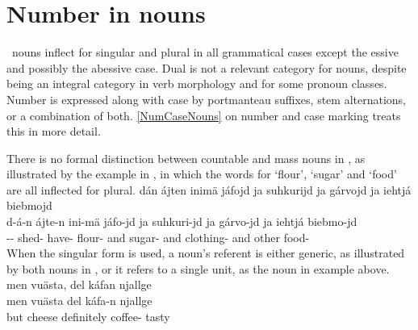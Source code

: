 \section{Number in nouns}\label{numberNouns}
\PS\ nouns inflect for singular and plural in all grammatical cases except the essive and possibly the abessive case. Dual is not a relevant category for nouns, despite being an integral category in verb morphology %
and for some pronoun classes. Number is expressed along with case by portmanteau suffixes, stem alternations, or a combination of both. %
\SEC\ref{NumCaseNouns} on number and case marking %
treats this in more detail.

There is no formal distinction between countable and mass nouns in \PS, as illustrated by the example in , in which the words for ‘flour’, ‘sugar’ and ‘food’ are all inflected for plural. %
\ea\label{uncountableEx1}
\glll	dán ájten inimä jáfojd ja suhkurijd ja gárvojd ja iehtjá biebmojd\\
	d-á-n ájte-n ini-mä jáfo-jd ja suhkuri-jd ja gárvo-jd ja iehtjá biebmo-jd\\
	-- shed- have- flour- and sugar- and clothing- and other food-\\\nopagebreak
{}	
\z
When the singular form is used, a noun’s referent is either generic, as illustrated by both nouns in , or it refers to a single unit, %
as the noun  in example  above. 
\ea\label{uncountableEx2}
\glll	men vuästa, del káfan njallge\\
	men vuästa del káfa-n njallge\\
	but cheese\BS{} definitely coffee- tasty\\\nopagebreak
{}	
\z


